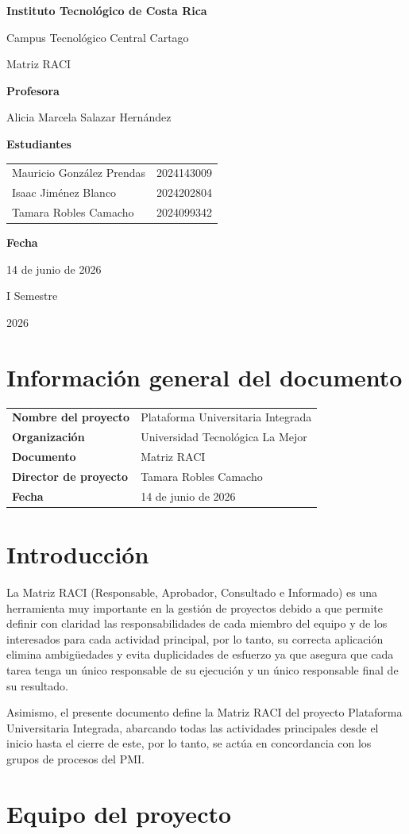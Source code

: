 \documentclass[11pt,spanish]{article}
\title{\DocumentoTitulo}
\author{\AutoresPortada}
\date{\FechaDocumento}
\makeatletter
\newcommand{\Institucion}{Instituto Tecnológico de Costa Rica}
\newcommand{\Campus}{Campus Tecnológico Central Cartago}
\newcommand{\DocumentoTitulo}{Matriz RACI}
\newcommand{\Profesor}{Alicia Marcela Salazar Hernández}
\newcommand{\FechaDocumento}{14 de junio de 2026}
\newcommand{\PeriodoAcademico}{I Semestre}
\newcommand{\AnioDocumento}{2026}
\newcommand{\AutoresPortada}{%
    \begin{tabular}{l@{\hspace{1.5cm}}r}
        Mauricio González Prendas & 2024143009\\
        Isaac Jiménez Blanco & 2024202804\\
        Tamara Robles Camacho & 2024099342
    \end{tabular}%
}
\newcommand{\MakeCover}{%
\begin{titlepage}
\thispagestyle{empty}
\centering

{\bfseries \huge \Institucion \par}
\vspace{0.25cm}
{\LARGE \Campus \par}

\vfill

{\huge \DocumentoTitulo \par}

\vfill

{\bfseries \LARGE Profesora \par}
{\Large \Profesor \par}

\vfill

{\bfseries \LARGE Estudiantes \par}
{\Large \AutoresPortada \par}

\vfill

{\bfseries\LARGE Fecha \par}
{\Large \FechaDocumento \par}

\vfill

{\LARGE \PeriodoAcademico \par}
{\LARGE \AnioDocumento \par}

\end{titlepage}%
}
\makeatother
\begin{document}
\hypersetup{pageanchor=false}

\MakeCover

\pagestyle{empty}
\tableofcontents
\clearpage
{}
\hypersetup{pageanchor=true}
\pagestyle{fancy}

\section{Información general del documento}

\begin{table}[H]
\centering
\begin{tabularx}{\textwidth}{p{5cm} Y}
\toprule
\textbf{Nombre del proyecto} & Plataforma Universitaria Integrada \\
\textbf{Organización} & Universidad Tecnológica La Mejor \\
\textbf{Documento} & \DocumentoTitulo \\
\textbf{Director de proyecto} & Tamara Robles Camacho \\
\textbf{Fecha} & \FechaDocumento \\
\bottomrule
\end{tabularx}
\end{table}

\section{Introducción}

La Matriz RACI (Responsable, Aprobador, Consultado e Informado) es una herramienta muy importante en la gestión de proyectos debido a que permite definir con claridad las responsabilidades de cada miembro del equipo y de los interesados para cada actividad principal, por lo tanto, su correcta aplicación elimina ambigüedades y evita duplicidades de esfuerzo ya que asegura que cada tarea tenga un único responsable de su ejecución y un único responsable final de su resultado.


Asimismo, el presente documento define la Matriz RACI del proyecto Plataforma Universitaria Integrada, abarcando todas las actividades principales desde el inicio hasta el cierre de este, por lo tanto, se actúa en concordancia con los grupos de procesos del PMI.

\section{Equipo del proyecto}
\end{document}
